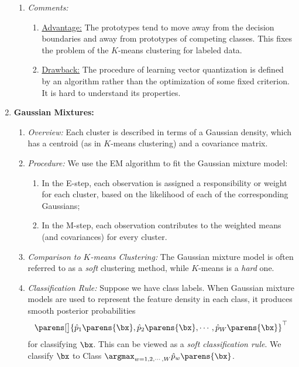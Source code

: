 \documentclass[12pt]{article}
\begin{document}
\begin{enumerate}[label=\textbf{\arabic*.}]
\begin{enumerate}
		\item \textit{Comments:}
		\begin{enumerate}
			\item \underline{Advantage:} The prototypes tend to move away from the decision boundaries and away from prototypes of competing classes. This fixes the problem of the $K$-means clustering for labeled data. 
			\item \underline{Drawback:} The procedure of learning vector quantization is defined by an algorithm rather than the optimization of some fixed criterion. It is hard to understand its properties. 
		\end{enumerate}
	\end{enumerate}
	
	\item \textbf{Gaussian Mixtures:} 
	\begin{enumerate}
		\item \textit{Overview:} Each cluster is described in terms of a Gaussian density, which has a centroid (as in $K$-means clustering) and a covariance matrix. 
		\item \textit{Procedure:} We use the EM algorithm to fit the Gaussian mixture model: 
		\begin{enumerate}
			\item In the E-step, each observation is assigned a responsibility or weight for each cluster, based on the likelihood of each of the corresponding Gaussians; %
			\item In the M-step, each observation contributes to the weighted means (and covariances) for every cluster. 
		\end{enumerate}
		
		\item \textit{Comparison to $K$-means Clustering:} The Gaussian mixture model is often referred to as a \emph{soft} clustering method, while $K$-means is a \emph{hard} one. 
		
		\item \textit{Classification Rule:} Suppose we have class labels. When Gaussian mixture models are used to represent the feature density in each class, it produces smooth posterior probabilities 
		\begin{align*}
			\parens[\big]{\hat{p}_1 \parens{\bx}, \hat{p}_2 \parens{\bx}, \cdots, \hat{p}_W \parens{\bx} }^\top
		\end{align*}
		for classifying $\bx$. This can be viewed as a \emph{soft classification rule}. We classify $\bx$ to Class $\argmax_{w=1, 2, \cdots, W} \hat{p}_w \parens{\bx}$. 
		
	\end{enumerate}

\end{enumerate}
\end{document}
